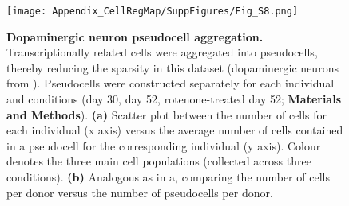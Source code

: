 \begin{figure}[h]
    \centering
    \texttt{[image: Appendix\_CellRegMap/SuppFigures/Fig\_S8.png]}
    \caption{\textbf{Dopaminergic neuron pseudocell aggregation.}
    Transcriptionally related cells were aggregated into pseudocells, thereby reducing the sparsity in this dataset (dopaminergic neurons from \cite{jerber2021population}). 
    Pseudocells were constructed separately for each individual and conditions (day 30, day 52, rotenone-treated day 52; \textbf{Materials and Methods}).
    \textbf{(a)} Scatter plot between the number of cells for each individual (x axis) versus the average number of cells contained in a pseudocell for the corresponding individual (y axis). 
    Colour denotes the three main cell populations (collected across three conditions). 
    \textbf{(b)} Analogous as in a, comparing the number of cells per donor versus the number of pseudocells per donor.
}
\end{figure}


